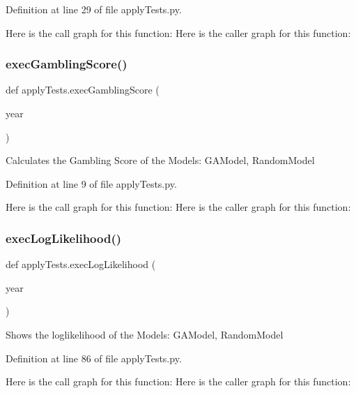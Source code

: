 Definition at line 29 of file apply\+Tests.\+py.

Here is the call graph for this function\+:
Here is the caller graph for this function\+:
\mbox{\label{namespaceapply_tests_ad9905c5ad071003f8de9a655576459bf}} 
\subsubsection{\texorpdfstring{exec\+Gambling\+Score()}{execGamblingScore()}}
{\footnotesize\ttfamily def apply\+Tests.\+exec\+Gambling\+Score (\begin{DoxyParamCaption}\item[{}]{year }\end{DoxyParamCaption})}

\begin{DoxyVerb}Calculates the Gambling Score
of the Models: GAModel, RandomModel
\end{DoxyVerb}
 

Definition at line 9 of file apply\+Tests.\+py.

Here is the call graph for this function\+:
Here is the caller graph for this function\+:
\mbox{\label{namespaceapply_tests_a5670d015fa02efcf8e1b7a8a99e45166}} 
\subsubsection{\texorpdfstring{exec\+Log\+Likelihood()}{execLogLikelihood()}}
{\footnotesize\ttfamily def apply\+Tests.\+exec\+Log\+Likelihood (\begin{DoxyParamCaption}\item[{}]{year }\end{DoxyParamCaption})}

\begin{DoxyVerb}Shows the loglikelihood 
of the Models: GAModel, RandomModel
\end{DoxyVerb}
 

Definition at line 86 of file apply\+Tests.\+py.

Here is the call graph for this function\+:
Here is the caller graph for this function\+:
\mbox{\label{namespaceapply_tests_a97febc347b565f9f65453be69ad57351}} 
